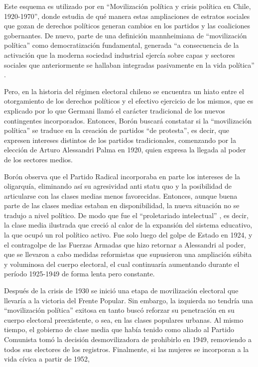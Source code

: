 {Este esquema es utilizado por \textcite{1571-BORON1970} en \enquote{Movilización política y crisis política en Chile, 1920-1970}, donde estudia de qué manera estas ampliaciones de estratos sociales que gozan de derechos políticos generan cambios en los partidos y las coaliciones gobernantes. De nuevo, parte de una definición mannheimiana de \enquote{movilización política} como democratización fundamental, generada \enquote{a consecuencia de la activación que la moderna sociedad industrial ejercía sobre capas y sectores sociales que anteriormente se hallaban integradas pasivamente en la vida política} \parencite[2]{1571-BORON1970}.

Pero, en la historia del régimen electoral chileno se encuentra un hiato entre el otorgamiento de los derechos políticos y el efectivo ejercicio de los mismos, que es explicado por lo que Germani llamó el carácter tradicional de los nuevos contingentes incorporados. Entonces, Borón buscará constatar si la \enquote{movilización política} se traduce en la creación de partidos \enquote{de protesta}, es decir, que expresen intereses distintos de los partidos tradicionales, comenzando por la elección de Arturo Alessandri Palma en 1920, quien expresa la llegada al poder de los sectores medios.

Borón observa que el Partido Radical incorporaba en parte los intereses de la oligarquía, eliminando así su agresividad anti statu quo y la posibilidad de articularse con las clases medias menos favorecidas. Entonces, aunque buena parte de las clases medias estaban en disponibilidad, la nueva situación no se tradujo a nivel político. De modo que fue el \enquote{proletariado intelectual} \parencite[15]{1571-BORON1970}, es decir, la clase media ilustrada que creció al calor de la expansión del sistema educativo, la que ocupó un rol político activo. Fue solo luego del golpe de Estado en 1924, y el contragolpe de las Fuerzas Armadas que hizo retornar a Alessandri al poder, que se llevaron a cabo medidas reformistas que supusieron una ampliación súbita y voluminosa del cuerpo electoral, el cual continuaría aumentando durante el período 1925-1949 de forma lenta pero constante.

Después de la crisis de 1930 se inició una etapa de movilización electoral que llevaría a la victoria del Frente Popular. Sin embargo, la izquierda no tendría una \enquote{movilización política} exitosa en tanto buscó reforzar su penetración en su cuerpo electoral preexistente, o sea, en las clases populares urbanas. Al mismo tiempo, el gobierno de clase media que había tenido como aliado al Partido Comunista tomó la decisión desmovilizadora de prohibirlo en 1949, removiendo a todos sus electores de los registros. Finalmente, si las mujeres se incorporan a la vida cívica a partir de 1952,

}
